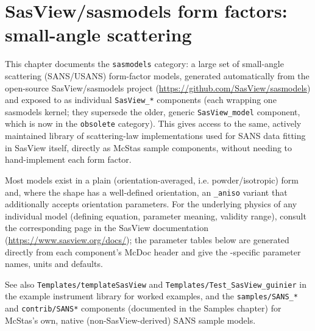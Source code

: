 
\chapter{SasView/sasmodels form factors: small-angle scattering}
\label{c:sasmodels}

This chapter documents the \texttt{sasmodels} category: a large set of
small-angle scattering (SANS/USANS) form-factor models, generated
automatically from the open-source SasView/sasmodels project
(\url{https://github.com/SasView/sasmodels}) and exposed to \MCS as
individual \texttt{SasView\_*} components (each wrapping one sasmodels
kernel; they supersede the older, generic \texttt{SasView\_model}
component, which is now in the \texttt{obsolete} category). This gives
access to the same, actively maintained library of scattering-law
implementations used for SANS data fitting in SasView itself, directly as
McStas sample components, without needing to hand-implement each form
factor.

Most models exist in a plain (orientation-averaged, i.e. powder/isotropic)
form and, where the shape has a well-defined orientation, an
\texttt{\_aniso} variant that additionally accepts orientation parameters.
For the underlying physics of any individual model (defining equation,
parameter meaning, validity range), consult the corresponding page in the
SasView documentation (\url{https://www.sasview.org/docs/}); the parameter
tables below are generated directly from each component's McDoc header and
give the \MCS-specific parameter names, units and defaults.

See also \texttt{Templates/templateSasView} and
\texttt{Templates/Test\_SasView\_guinier} in the example instrument library
for worked examples, and the \texttt{samples/SANS\_*} and
\texttt{contrib/SANS*} components (documented in the Samples chapter) for
McStas's own, native (non-SasView-derived) SANS sample models.

